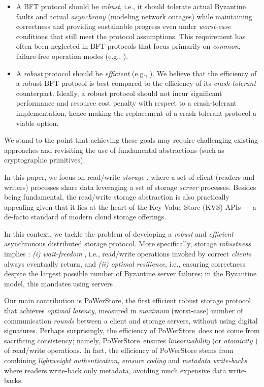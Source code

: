 \documentclass[10pt,conference,compsocconf]{IEEEtran}
\newcommand{\protocol}{PoWerStore}
\begin{document}
\begin{itemize}
\item A BFT protocol should be \emph{robust}, i.e., it should tolerate actual Byzantine faults and  actual \emph{asynchrony} (modeling network outages) while maintaining correctness and providing sustainable progress even under \emph{worst-case} conditions that still meet the protocol assumptions. This requirement has often been neglected in BFT protocols that focus primarily on \emph{common}, failure-free operation modes (e.g., \cite{HendricksGR07,KotlaADCW09,GV10}).

\item A \emph{robust} protocol should be \emph{efficient} (e.g., \cite{GarciaRP11, VeroneseCBLV13}). We believe that the efficiency of a robust BFT protocol is best compared to the efficiency of its \emph{crash-tolerant} counterpart. Ideally, a robust protocol should not incur significant performance and resource cost penalty with respect to a crash-tolerant implementation, hence making the replacement of a crash-tolerant protocol a viable option.
\end{itemize}

We stand to the point that achieving these goals may require challenging existing approaches and revisiting the use of fundamental abstractions (such as cryptographic primitives).

In this paper, we focus on read/write \emph{storage} \cite{Lam86}, where a set of client (readers and writers) processes share data leveraging a set of storage
\emph{server} processes. Besides being fundamental, the read/write storage abstraction is also practically appealing given that it lies at the heart of the Key-Value Store (KVS) APIs --- a de-facto standard of modern cloud storage offerings.

In this context, we tackle the problem of developing a \emph{robust} and \emph{efficient} asynchronous distributed storage protocol. More specifically, storage \emph{robustness} implies \cite{ABND95}: \emph{(i)} \emph{wait-freedom} \cite{Her91}, i.e., read/write operations invoked by correct \emph{clients} always eventually return,
and \emph{(ii)} \emph{optimal resilience}, i.e., ensuring correctness despite the largest possible number  of Byzantine server  failures; in the Byzantine model, this mandates using  servers \cite{MAD02}.


Our main contribution is \protocol, the first efficient robust storage protocol that
achieves \emph{optimal latency}, measured in \emph{maximum} (worst-case) number of communication \emph{rounds} between a client and storage servers, without using digital signatures. Perhaps surprisingly, the efficiency of \protocol\ does not come from sacrificing consistency; namely, \protocol\ ensures \emph{linearizability} \cite{HW90} (or \emph{atomicity} \cite{Lam86}) of read/write operations. In fact, the efficiency of \protocol{} stems from combining \emph{lightweight
authentication}, \emph{erasure coding} and \emph{metadata write-backs}
where readers write-back only metadata, avoiding much expensive data write-backs.
\end{document}
